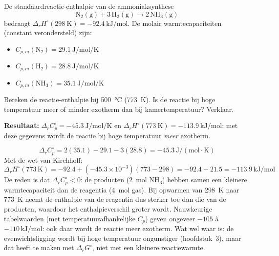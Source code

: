 \begin{oefening}\label{oef:h1-5}
De standaardreactie-enthalpie van de ammoniaksynthese
\[
\mathrm{N_2(g) + 3\,H_2(g) \rightarrow 2\,NH_3(g)}
\]
bedraagt $\Delta_r H^\circ(\SI{298}{\kelvin}) = \SI{-92.4}{\kilo\joule\per\mole}$. De molair warmtecapaciteiten (constant verondersteld) zijn:
\begin{itemize}
\item $C_{p,m}(\mathrm{N_2}) = \SI{29.1}{\joule\per\mole\per\kelvin}$
\item $C_{p,m}(\mathrm{H_2}) = \SI{28.8}{\joule\per\mole\per\kelvin}$
\item $C_{p,m}(\mathrm{NH_3}) = \SI{35.1}{\joule\per\mole\per\kelvin}$
\end{itemize}
Bereken de reactie-enthalpie bij \SI{500}{\celsius} (\SI{773}{\kelvin}). Is de reactie bij hoge temperatuur meer of minder exotherm dan bij kamertemperatuur? Verklaar.    
\end{oefening}
\begin{oplossing}
\textbf{Resultaat:} $\Delta_r C_p^\circ = \SI{-45.3}{\joule\per\mole\per\kelvin}$ en $\Delta_r H^\circ(\SI{773}{\kelvin}) = \SI{-113.9}{\kilo\joule\per\mole}$: met deze gegevens wordt de reactie bij hoge temperatuur \emph{meer} exotherm.

\[
\Delta_r C_p^\circ = 2(35.1) - 29.1 - 3(28.8) = -45.3\,\mathrm{J/(mol\cdot K)}
\]
Met de wet van Kirchhoff:
\[
\Delta_r H^\circ(773\,\mathrm{K}) = -92.4 + (-45.3\times10^{-3})(773-298) = -92.4 - 21.5 = -113.9\,\mathrm{kJ/mol}
\]
De reden is dat $\Delta_r C_p^\circ < 0$: de producten (2~mol $\mathrm{NH_3}$) hebben samen een kleinere warmtecapaciteit dan de reagentia (4~mol gas). Bij opwarmen van 298~K naar 773~K neemt de enthalpie van de reagentia dus sterker toe dan die van de producten, waardoor het enthalpieverschil groter wordt. Nauwkeurige tabelwaarden (met temperatuurafhankelijke $C_p$) geven ongeveer $-105$ \`a $-110\,\mathrm{kJ/mol}$: ook daar wordt de reactie meer exotherm. Wat wel waar is: de evenwichtsligging wordt bij hoge temperatuur ongunstiger (hoofdstuk~3), maar dat heeft te maken met $\Delta_r G^\circ$, niet met een kleinere reactiewarmte.
\end{oplossing}

